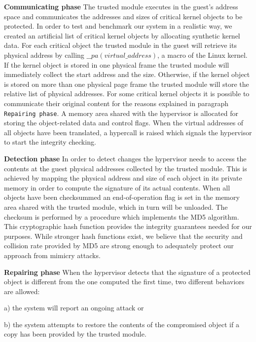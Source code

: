 \textbf{Communicating phase}
The trusted module executes in the guest's address space and communicates the addresses and sizes of critical kernel objects to be protected. 
In order to test and benchmark our system in a realistic way, we created an artificial list of critical kernel objects by allocating synthetic kernel data.
For each critical object the trusted module in the guest will retrieve its physical address by calling $\_\_pa(virtual\_address)$, a macro of the Linux kernel. 
If the kernel object is stored in one physical frame the trusted module will immediately collect the start address and the size. Otherwise, if the kernel object is stored on more than one physical page 
frame the trusted module will store the relative list of physical addresses. 
For some critical kernel objects it is possible to communicate their original content for the reasons explained in paragraph \texttt{Repairing phase}. 
A memory area shared with the hypervisor is allocated for storing the object-related data and control flags. 
When the virtual addresses of all objects have been translated, a hypercall is raised which signals the hypervisor to start the integrity checking.

\textbf{Detection phase}
In order to detect changes the hypervisor needs to access the contents at the guest physical addresses collected by the trusted module. This is achieved by mapping the physical address and size of each object in its private memory in order to compute the signature of its actual contents. When all objects have been checksummed an end-of-operation flag is set in the memory area shared with the trusted module, which in turn will be unloaded. 
The checksum is performed by a procedure which implements the MD5 algorithm\cite{md5rfc}. This cryptographic hash function provides the integrity guarantees needed for our purposes. While stronger hash functions exist, we believe that the security and collision rate provided by MD5 are strong enough to adequately protect our approach from mimicry attacks. 

\textbf{Repairing phase}
When the hypervisor detects that the signature of a protected object is different from the one computed the first time, two different behaviors are allowed: 

a) the system will report an ongoing attack or 

b) the system attempts to restore the contents of the compromised object if a copy has been provided by the trusted module. 

